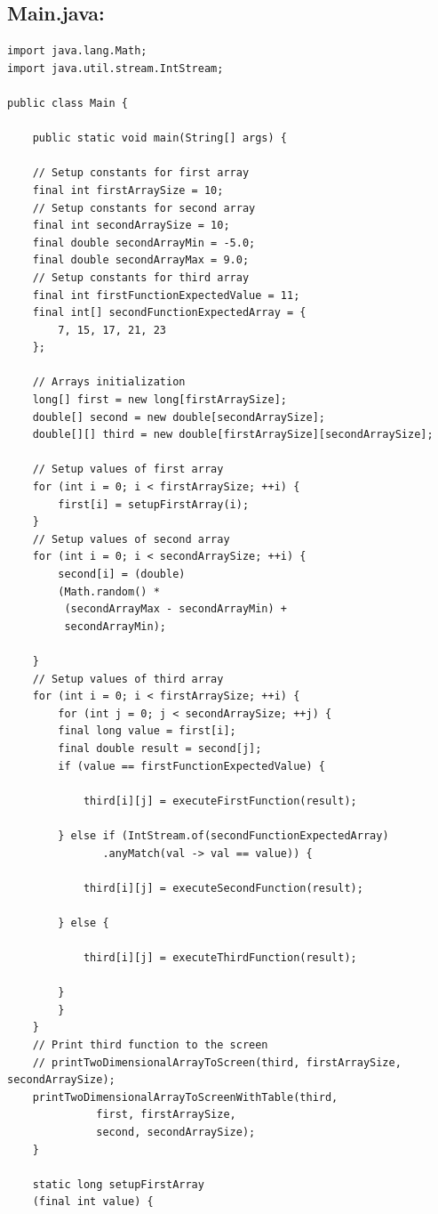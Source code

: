 \documentclass[11pt]{article}
\begin{document}
\subsection{Main.java:}
\label{sec:org21d6884}
\small
\lstset{language=Java,label= ,caption= ,captionpos=b,numbers=none}
\begin{lstlisting}
import java.lang.Math;
import java.util.stream.IntStream;

public class Main {

    public static void main(String[] args) {

	// Setup constants for first array
	final int firstArraySize = 10;
	// Setup constants for second array
	final int secondArraySize = 10;
	final double secondArrayMin = -5.0;
	final double secondArrayMax = 9.0;
	// Setup constants for third array
	final int firstFunctionExpectedValue = 11;
	final int[] secondFunctionExpectedArray = {
	    7, 15, 17, 21, 23
	};

	// Arrays initialization
	long[] first = new long[firstArraySize];
	double[] second = new double[secondArraySize];
	double[][] third = new double[firstArraySize][secondArraySize];

	// Setup values of first array
	for (int i = 0; i < firstArraySize; ++i) {
	    first[i] = setupFirstArray(i);
	}
	// Setup values of second array
	for (int i = 0; i < secondArraySize; ++i) {
	    second[i] = (double)
		(Math.random() *
		 (secondArrayMax - secondArrayMin) +
		 secondArrayMin);

	}
	// Setup values of third array
	for (int i = 0; i < firstArraySize; ++i) {
	    for (int j = 0; j < secondArraySize; ++j) {
		final long value = first[i];
		final double result = second[j];
		if (value == firstFunctionExpectedValue) {

		    third[i][j] = executeFirstFunction(result);

		} else if (IntStream.of(secondFunctionExpectedArray)
			   .anyMatch(val -> val == value)) {

		    third[i][j] = executeSecondFunction(result);

		} else {

		    third[i][j] = executeThirdFunction(result);

		}
	    }
	}
	// Print third function to the screen
	// printTwoDimensionalArrayToScreen(third, firstArraySize, secondArraySize);
	printTwoDimensionalArrayToScreenWithTable(third,
			  first, firstArraySize,
			  second, secondArraySize);
    }

    static long setupFirstArray
	(final int value) {


\end{lstlisting}
\end{document}
